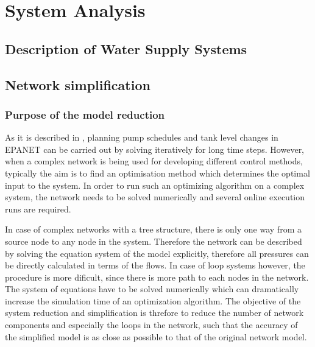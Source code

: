 
\part{System Analysis}
\label{system_analysis}

\chapter{Description of Water Supply Systems}
\label{description_of_water_supply_systems}

 





\chapter{Network simplification}
\label{network_simplification}

\section{Purpose of the model reduction}
\label{purpose_of_the_model_reduction}

As it is described in , planning pump schedules and tank level changes in EPANET can be carried out by solving iteratively for long time steps. However, when a complex network is being used for developing different control methods, typically the aim is to find an optimisation method which determines the optimal input to the system. In order to run such an optimizing algorithm on a complex system, the network needs to be solved numerically and several online execution runs are required. 

In case of complex networks with a tree structure, there is only one way from a source node to any node in the system. Therefore the network can be described by solving the equation system of the model explicitly, therefore all pressures can be directly calculated in terms of the flows. In case of loop systems however, the procedure is more dificult, since there is more path to each nodes in the network. The system of equations have to be solved numerically which can dramatically increase the simulation time of an optimization algorithm. The objective of the system reduction and simplification is threfore to reduce the number of network components and especially the loops in the network, such that the accuracy of the simplified model is as close as possible to that of the original network model. 


